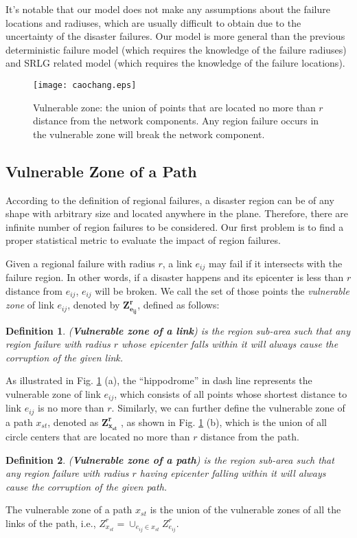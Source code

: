 \documentclass[10pt,journal]{IEEEtran}
\newtheorem{definition}{Definition}
\begin{document}
It's notable that our model does not make any assumptions about the failure locations and radiuses, which are usually difficult to obtain due to the uncertainty of the disaster failures. Our model is more general than the previous deterministic failure model \cite{S09rbc, N08ati} (which requires the knowledge of the failure radiuses) and SRLG related model \cite{SRLG,H03dri, D04drf, S05srl, W10oao, L10dri} (which requires the knowledge of the failure locations).

\begin{figure}
	\centering
		\texttt{[image: caochang.eps]}
	\caption{Vulnerable zone: the union of points that are located no more than $r$ distance from the network components. Any region failure occurs in the vulnerable zone will break the network component.}
	\label{fig:caochang}
\end{figure}
\subsection{Vulnerable Zone of a Path}
According to the definition of regional failures, a disaster region can be of any shape with arbitrary size and located anywhere in the plane. Therefore, there are infinite number of region failures to be considered. Our first problem is to find a proper statistical metric to evaluate the impact of region failures.

Given a regional failure with radius $r$, a link $e_{ij}$ may fail if it intersects with the failure region. In other words, if a disaster happens and its epicenter is less than $r$ distance from $e_{ij}$, $e_{ij}$ will be broken. We call the set of those points the \emph{vulnerable zone} of link $e_{ij}$, denoted by \textbf{$\bm{Z^{r}_{e_{ij}}}$}, defined as follows:
\begin{definition} (\textbf{Vulnerable zone of a link}) is the region sub-area such that any region failure with radius $r$  whose epicenter falls within it will always cause the corruption of the given link.
\end{definition}
As illustrated in Fig. \ref{fig:caochang} (a), the ``hippodrome'' in dash line represents the vulnerable zone of link $e_{ij}$, which consists of all points whose shortest distance to link $e_{ij}$ is no more than $r$.
Similarly, we can further define the vulnerable zone of a path $x_{st}$, denoted as $\bm{Z^{r}_{x_{st}}}$ , as shown in Fig. \ref{fig:caochang} (b), which is the union of all circle centers that are located no more than $r$ distance from the path.
\begin{definition} (\textbf{Vulnerable zone of a path}) is the region sub-area such that any region failure with radius $r$ having epicenter falling within it will always cause the corruption of the given path.
\end{definition}
The vulnerable zone of a path $x_{st}$ is the union of the vulnerable zones of all the links of the path, i.e., $Z^{r}_{x_{st}}=\cup_{e_{ij}\in x_{st}}Z^{r}_{e_{ij}}$.
\end{document}
